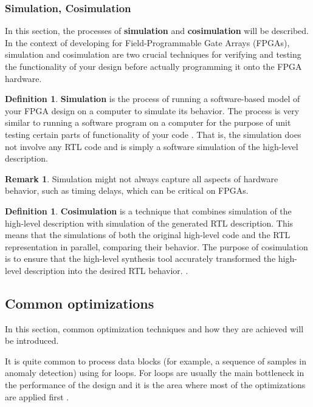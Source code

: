 \documentclass[a4paper, twoside]{report}
\theoremstyle{definition}
\newtheorem{definition}[theorem]{Definition}
\newtheorem{remark}[theorem]{Remark}
\numberwithin{equation}{section}
\begin{document}
\subsubsection{Simulation, Cosimulation}

In this section, the processes of \textbf{simulation} and \textbf{cosimulation} will be described.
In the context of developing for Field-Programmable Gate Arrays (FPGAs),
simulation and cosimulation are two crucial techniques for verifying and testing the
functionality of your design before actually programming it onto the FPGA hardware.

\begin{definition}
    \textbf{Simulation} is the process of running a software-based model of your FPGA design on
    a computer to simulate its behavior.
    The process is very similar to running a software program on a computer for
    the purpose of unit testing certain parts of functionality of your code
    \cite{AMD2023VitisSimCosim}. That is, the simulation does not
    involve any RTL code and is simply a software simulation of the high-level description.
\end{definition}

\begin{remark}
    Simulation might not always capture all aspects of hardware behavior, such as timing delays, which can be critical on FPGAs.
\end{remark}

\begin{definition}
    \textbf{Cosimulation} is a technique that combines simulation of the high-level description with simulation of the generated RTL description.
    This means that the simulations of both the original high-level code and the RTL representation in parallel, comparing their behavior.
    The purpose of cosimulation is to ensure that the high-level synthesis tool accurately transformed the high-level description into the desired RTL behavior.
    \cite{AMD2023VitisSimCosim}.
\end{definition}

\subsection{Common optimizations} \label{sec:common_optimizations}

In this section, common optimization techniques and how they are achieved will be introduced.

It is quite common to process data blocks
(for example, a sequence of samples in anomaly detection) using for loops.
For loops are usually the main bottleneck in the performance of the design
and it is the area where most of the optimizations are applied first \cite{AMD2023VitisHLS}.
\end{document}
